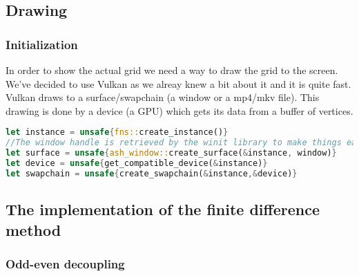 \documentclass{article}
\begin{document}
\subsection{Drawing}
\subsubsection{Initialization}
In order to show the actual grid we need a way to draw the grid to the screen. We've decided to use Vulkan as we alreay knew a bit about it and it is quite fast.\cite{Vulkan} Vulkan draws to a surface/swapchain (a window or a mp4/mkv file). This drawing is done by a device (a GPU) which gets its data from a buffer of vertices.
\begin{lstlisting}[language=Rust, style=boxed]
let instance = unsafe{fns::create_instance()}
//The window handle is retrieved by the winit library to make things easier
let surface = unsafe{ash_window::create_surface(&instance, window)}
let device = unsafe{get_compatible_device(&instance)}
let swapchain = unsafe{create_swapchain(&instance,&device)}
\end{lstlisting}





\subsection{The implementation of the finite difference method}
\subsubsection{Odd-even decoupling}
\end{document}
